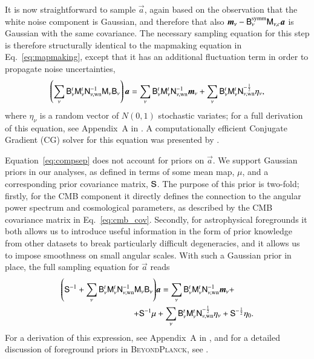 \documentclass[twocolumn]{aa}
\renewcommand{\a}[0]{\vec{a}}
\newcommand{\m}[0]{\vec{m}}
\newcommand{\B}[0]{\tens{B}}
\newcommand{\N}[0]{\tens{N}}
\newcommand{\M}[0]{\tens{M}}
\renewcommand{\S}[0]{\tens{S}}
\newcommand{\BP}{\textsc{BeyondPlanck}}
\begin{document}
It is now straightforward to sample $\a$, again based on the
observation that the white noise component is Gaussian, and therefore
that also $\m_{\nu}-\B^{\mathrm{symm}}_{\nu}\M_{\nu,c}\a$ is Gaussian
with the same covariance. The necessary sampling equation for this
step is therefore structurally identical to the mapmaking equation in
Eq.~\eqref{eq:mapmaking}, except that it has an additional fluctuation
term in order to propagate noise uncertainties,
\begin{equation}
  \left(\sum_{\nu}\B_\nu^t\M_\nu^t\N^{-1}_{\nu,\mathrm{wn}}\M_\nu\B_\nu\right)\a
  = \sum_\nu \B_{\nu}^t\M_{\nu}^t\N_{\nu,\mathrm{wn}}^{-1}\m_{\nu} +
  \sum_{\nu}
  \B_{\nu}^t\M_{\nu}^t\N_{\nu,\mathrm{wn}}^{-\frac{1}{2}}\eta_{\nu},
  \label{eq:compsep}
\end{equation}
where $\eta_{\nu}$ is a random vector of $N(0,1)$ stochastic variates;
for a full derivation of this equation, see Appendix~A in
\citet{bp01}. A computationally efficient Conjugate Gradient (CG)
solver for this equation was presented by \citet{seljebotn:2019}.

Equation~\eqref{eq:compsep} does not account for priors on $\a$. We
support Gaussian priors in our analyses, as defined in terms of some
mean map, $\mu$, and a corresponding prior covariance matrix,
$\S$. The purpose of this prior is two-fold; firstly, for the CMB
component it directly defines the connection to the angular power
spectrum and cosmological parameters, as described by the CMB
covariance matrix in Eq.~\eqref{eq:cmb_cov}. Secondly, for
astrophysical foregrounds it both allows us to introduce useful
information in the form of prior knowledge from other datasets to
break particularly difficult degeneracies, and it allows us to impose
smoothness on small angular scales. With such a Gaussian prior in
place, the full sampling equation for $\a$ reads
\begin{equation}
  \begin{split}
  \left(\S^{-1} + \sum_{\nu}\B_\nu^t\M_\nu^t\N^{-1}_{\nu,\mathrm{wn}}\M_\nu\B_\nu\right)&\a
  = \sum_\nu \B_{\nu}^t\M_{\nu}^t\N_{\nu,\mathrm{wn}}^{-1}\m_{\nu} +\\
  +\S^{-1}\mu &+
  \sum_{\nu}
  \B_{\nu}^t\M_{\nu}^t\N_{\nu,\mathrm{wn}}^{-\frac{1}{2}}\eta_{\nu} +
  \S^{-\frac{1}{2}}\eta_0.
  \end{split}
  \label{eq:compsep_with_prior}
\end{equation}
For a derivation of this expression, see Appendix~A in \citet{bp01},
and for a detailed discussion of foreground priors in \BP, see
\citet{bp13}.
\end{document}
